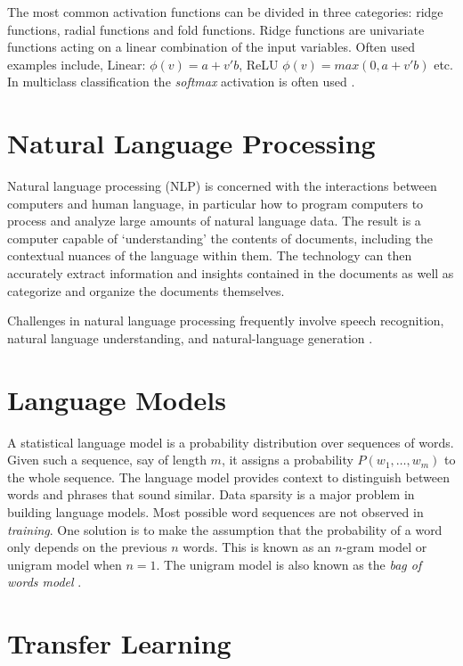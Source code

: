 The most common activation functions can be divided in three categories: ridge functions, radial functions and fold functions. Ridge functions are univariate functions acting on a linear combination of the input variables. Often used examples include, Linear: $\phi(v) = a + v'b$, ReLU $\phi(v) = max(0, a + v'b)$ etc. In multiclass classification the \emph{softmax} activation is often used \cite{wiki:actvfnc}.

\section*{Natural Language Processing}
\label{sec:nlp}

Natural language processing (NLP) is concerned with the interactions between computers and human language, in particular how to program computers to process and analyze large amounts of natural language data. The result is a computer capable of ‘understanding’ the contents of documents, including the contextual nuances of the language within them. The technology can then accurately extract information and insights contained in the documents as well as categorize and organize the documents themselves.

Challenges in natural language processing frequently involve speech recognition, natural language understanding, and natural-language generation \cite{wiki:nlp}. 

\section*{Language Models}
\label{sec:langmodls}

\hspace{0.5cm} A statistical language model is a probability distribution over sequences of words. Given such a sequence, say of length $m$, it assigns a probability $P(w_1, \dots, w_m)$ to the whole sequence. The language model provides context to distinguish between words and phrases that sound similar. Data sparsity is a major problem in building language models. Most possible word sequences are not observed in \emph{training}. One solution is to make the assumption that the probability of a word only depends on the previous $n$ words. This is known as an $n$-gram model or unigram model when $n = 1$. The unigram model is also known as the \emph{bag of words model} \cite{wiki:langmdl}.

\section*{Transfer Learning}
\label{sec:trnsfrlrn}

